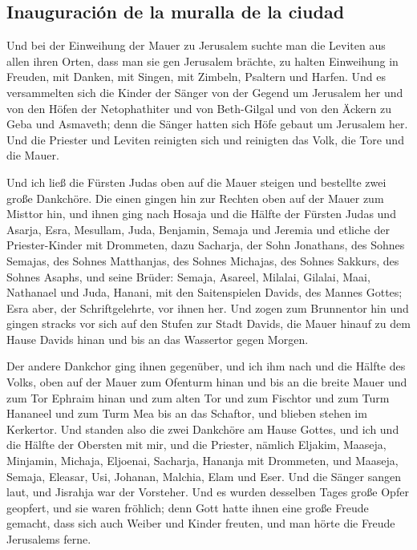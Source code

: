 \hypertarget{inauguraciuxf3n-de-la-muralla-de-la-ciudad}{%
\subsection{Inauguración de la muralla de la
ciudad}\label{inauguraciuxf3n-de-la-muralla-de-la-ciudad}}

 Und bei der Einweihung der Mauer zu Jerusalem suchte man
die Leviten aus allen ihren Orten, dass man sie gen Jerusalem brächte,
zu halten Einweihung in Freuden, mit Danken, mit Singen, mit Zimbeln,
Psaltern und Harfen.  Und es versammelten sich die Kinder
der Sänger von der Gegend um Jerusalem her und von den Höfen der
Netophathiter  und von Beth-Gilgal und von den Äckern zu
Geba und Asmaveth; denn die Sänger hatten sich Höfe gebaut um Jerusalem
her.  Und die Priester und Leviten reinigten sich und
reinigten das Volk, die Tore und die Mauer.

 Und ich ließ die Fürsten Judas oben auf die Mauer
steigen und bestellte zwei große Dankchöre. Die einen gingen hin zur
Rechten oben auf der Mauer zum Misttor hin,  und ihnen
ging nach Hosaja und die Hälfte der Fürsten Judas  und
Asarja, Esra, Mesullam,  Juda, Benjamin, Semaja und
Jeremia  und etliche der Priester-Kinder mit Drommeten,
dazu Sacharja, der Sohn Jonathans, des Sohnes Semajas, des Sohnes
Matthanjas, des Sohnes Michajas, des Sohnes Sakkurs, des Sohnes Asaphs,
 und seine Brüder: Semaja, Asareel, Milalai, Gilalai,
Maai, Nathanael und Juda, Hanani, mit den Saitenspielen Davids, des
Mannes Gottes; Esra aber, der Schriftgelehrte, vor ihnen her.
 Und zogen zum Brunnentor hin und gingen stracks vor sich
auf den Stufen zur Stadt Davids, die Mauer hinauf zu dem Hause Davids
hinan und bis an das Wassertor gegen Morgen.

 Der andere Dankchor ging ihnen gegenüber, und ich ihm
nach und die Hälfte des Volks, oben auf der Mauer zum Ofenturm hinan und
bis an die breite Mauer  und zum Tor Ephraim hinan und
zum alten Tor und zum Fischtor und zum Turm Hananeel und zum Turm Mea
bis an das Schaftor, und blieben stehen im Kerkertor. 
Und standen also die zwei Dankchöre am Hause Gottes, und ich und die
Hälfte der Obersten mit mir,  und die Priester, nämlich
Eljakim, Maaseja, Minjamin, Michaja, Eljoenai, Sacharja, Hananja mit
Drommeten,  und Maaseja, Semaja, Eleasar, Usi, Johanan,
Malchia, Elam und Eser. Und die Sänger sangen laut, und Jisrahja war der
Vorsteher.  Und es wurden desselben Tages große Opfer
geopfert, und sie waren fröhlich; denn Gott hatte ihnen eine große
Freude gemacht, dass sich auch Weiber und Kinder freuten, und man hörte
die Freude Jerusalems ferne.

